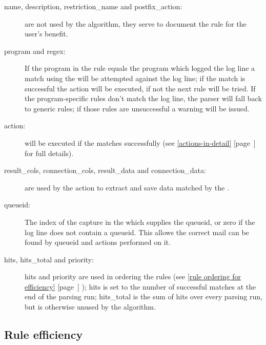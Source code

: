 \documentclass[a4paper,12pt,draft]{article}
\newcommand{\refwithpage}[1]{%
    \empty{}\ref{#1} [page~\pageref{#1}]%
}
\newcommand{\sectionref}[1]{%
    \textsection{}\refwithpage{#1}%
}
\begin{document}
\begin{description}

    \item [name, description, restriction\_name and postfix\_action:] are
        not \newline used by the algorithm, they serve to document the rule
        for the user's benefit.

    \item [program and regex:] If the program in the rule equals the
        program which logged the log line a match using the \regex{} will
        be attempted against the log line; if the match is successful the
        action will be executed, if not the next rule will be tried.  If
        the program-specific rules don't match the log line, the parser
        will fall back to generic rules; if those rules are unsuccessful a
        warning will be issued.

    \item [action:] will be executed if the \regex{} matches successfully
        (see \sectionref{actions-in-detail} for full details).

    \item [result\_cols, connection\_cols, result\_data and
        connection\_data:] are \newline used by the action to extract and
        save data matched by the \regex{}.

    \item [queueid:] The index of the capture in the \regex{} which
        supplies the queueid, or zero if the log line does not contain a
        queueid.  This allows the correct mail can be found by queueid and
        actions performed on it.

    \item [hits, hits\_total and priority:] hits and priority are used in
        ordering the rules (see \sectionref{rule ordering for efficiency});
        hits is set to the number of successful matches at the end of the
        parsing run; hits\_total is the sum of hits over every parsing run,
        but is otherwise unused by the algorithm.

\end{description}



\subsection{Rule efficiency}
\end{document}

